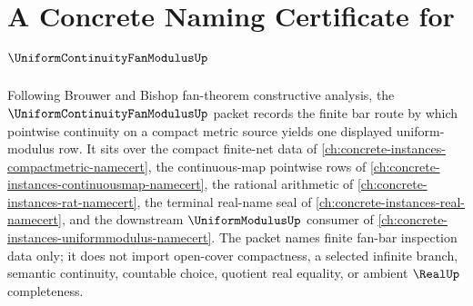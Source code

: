 \chapter{A Concrete Naming Certificate for $\UniformContinuityFanModulusUp$}
\label{ch:concrete-instances-uniform-continuity-fan-modulus-namecert}

Following Brouwer and Bishop fan-theorem constructive analysis, the $\UniformContinuityFanModulusUp$ packet records the finite bar route by which pointwise continuity on a compact metric source yields one displayed uniform-modulus row. It sits over the compact finite-net data of \autoref{ch:concrete-instances-compactmetric-namecert}, the continuous-map pointwise rows of \autoref{ch:concrete-instances-continuousmap-namecert}, the rational arithmetic of \autoref{ch:concrete-instances-rat-namecert}, the terminal real-name seal of \autoref{ch:concrete-instances-real-namecert}, and the downstream $\UniformModulusUp$ consumer of \autoref{ch:concrete-instances-uniformmodulus-namecert}. The packet names finite fan-bar inspection data only; it does not import open-cover compactness, a selected infinite branch, semantic continuity, countable choice, quotient real equality, or ambient $\RealUp$ completeness.

